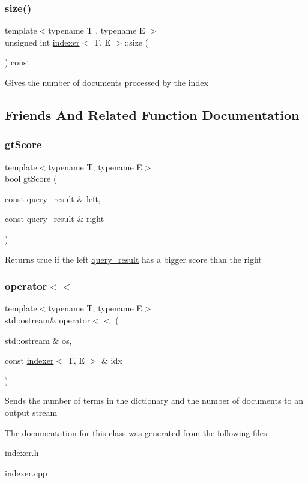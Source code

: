 \subsubsection{\texorpdfstring{size()}{size()}}
{\footnotesize\ttfamily template$<$typename T , typename E $>$ \\
unsigned int \hyperlink{classindexer}{indexer}$<$ T, E $>$\+::size (\begin{DoxyParamCaption}{ }\end{DoxyParamCaption}) const}

Gives the number of documents processed by the index 

\subsection{Friends And Related Function Documentation}
\mbox{\label{classindexer_af90a86217251694caa9471be14515ee9}} 
\subsubsection{\texorpdfstring{gt\+Score}{gtScore}}
{\footnotesize\ttfamily template$<$typename T, typename E$>$ \\
bool gt\+Score (\begin{DoxyParamCaption}\item[{const \hyperlink{classquery__result}{query\+\_\+result} \&}]{left,  }\item[{const \hyperlink{classquery__result}{query\+\_\+result} \&}]{right }\end{DoxyParamCaption})\hspace{0.3cm}{\ttfamily [friend]}}

Returns true if the left \hyperlink{classquery__result}{query\+\_\+result} has a bigger score than the right \mbox{\label{classindexer_afbe836c0f0a47dc1393416275175fadb}} 
\subsubsection{\texorpdfstring{operator$<$$<$}{operator<<}}
{\footnotesize\ttfamily template$<$typename T, typename E$>$ \\
std\+::ostream\& operator$<$$<$ (\begin{DoxyParamCaption}\item[{std\+::ostream \&}]{os,  }\item[{const \hyperlink{classindexer}{indexer}$<$ T, E $>$ \&}]{idx }\end{DoxyParamCaption})\hspace{0.3cm}{\ttfamily [friend]}}

Sends the number of terms in the dictionary and the number of documents to an output stream 

The documentation for this class was generated from the following files\+:\begin{DoxyCompactItemize}
\item 
indexer.\+h\item 
indexer.\+cpp\end{DoxyCompactItemize}
